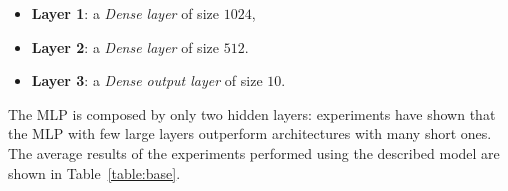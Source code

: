 \documentclass[oneside,openany]{article}
\begin{document}
    \begin{itemize}
    \item \textbf{Layer 1}: a \textit{Dense layer} of size $1024$,
    \item \textbf{Layer 2}: a \textit{Dense layer} of size $512$.
    \item \textbf{Layer 3}: a \textit{Dense output layer} of size $10$.
    \end{itemize}
    The MLP is composed by only two hidden layers: experiments have shown that the MLP with few large layers outperform architectures with many short ones.
    The average results of the experiments performed using the described model are shown in Table~\ref{table:base}.
    \begin{table}[ht]
        \caption{Results obtained by the MLP trained on the Base statistics dataset}
        \label{table:base}
    \end{table}
    
\end{document}
